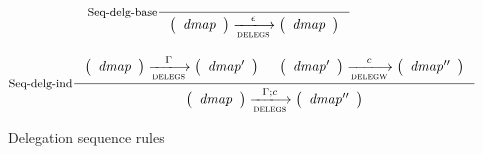 \begin{figure}
  \begin{equation}
    \inference[Seq-delg-base]
    {}
    { \left(
        \begin{array}{r}
          \var{dmap}
        \end{array}
      \right)
        \trans{delegs}{\epsilon}
      \left(
        \begin{array}{r}
          \var{dmap}
        \end{array}
      \right)
    }
    \label{eq:rule:sequence-delegation-base}
  \end{equation}

  \begin{equation}
    \inference[Seq-delg-ind]
    { {\left(
        \begin{array}{r}
          \var{dmap}
        \end{array}
      \right)}
      \trans{delegs}{\Gamma}
      {\left(
        \begin{array}{r}
          \var{dmap'}
        \end{array}
      \right)}
    &
    {\left(
        \begin{array}{r}
          \var{dmap'}
        \end{array}
      \right)}
      \trans{delegw}{c}
      {\left(
        \begin{array}{r}
          \var{dmap''}
        \end{array}
      \right)}
    }
    { \left(
        \begin{array}{r}
          \var{dmap}
        \end{array}
      \right)
      \trans{delegs}{\Gamma; c}
      \left(
        \begin{array}{r}
          \var{dmap''}
        \end{array}
      \right)
    }
    \label{eq:rule:sequence-delegation-inductive}
  \end{equation}
  \caption{Delegation sequence rules}
  \label{fig:rules:delegation-sequence}
\end{figure}


